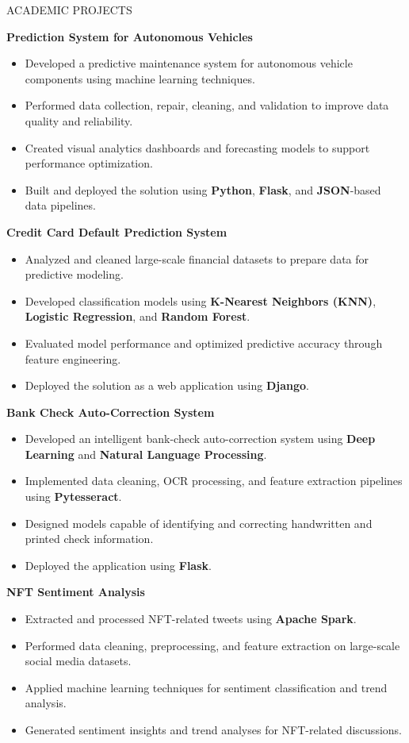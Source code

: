 \documentclass{resume} %
\begin{document}
\begin{rSection}{ACADEMIC PROJECTS}

\textbf{Prediction System for Autonomous Vehicles}
\begin{itemize}
  \itemsep -3pt
  \item Developed a predictive maintenance system for autonomous vehicle components using machine learning techniques.
  \item Performed data collection, repair, cleaning, and validation to improve data quality and reliability.
  \item Created visual analytics dashboards and forecasting models to support performance optimization.
  \item Built and deployed the solution using \textbf{Python}, \textbf{Flask}, and \textbf{JSON}-based data pipelines.
\end{itemize}

\textbf{Credit Card Default Prediction System}
\begin{itemize}
  \itemsep -3pt
  \item Analyzed and cleaned large-scale financial datasets to prepare data for predictive modeling.
  \item Developed classification models using \textbf{K-Nearest Neighbors (KNN)}, \textbf{Logistic Regression}, and \textbf{Random Forest}.
  \item Evaluated model performance and optimized predictive accuracy through feature engineering.
  \item Deployed the solution as a web application using \textbf{Django}.
\end{itemize}

\textbf{Bank Check Auto-Correction System}
\begin{itemize}
  \itemsep -3pt
  \item Developed an intelligent bank-check auto-correction system using \textbf{Deep Learning} and \textbf{Natural Language Processing}.
  \item Implemented data cleaning, OCR processing, and feature extraction pipelines using \textbf{Pytesseract}.
  \item Designed models capable of identifying and correcting handwritten and printed check information.
  \item Deployed the application using \textbf{Flask}.
\end{itemize}

\textbf{NFT Sentiment Analysis}
\begin{itemize}
  \itemsep -3pt
  \item Extracted and processed NFT-related tweets using \textbf{Apache Spark}.
  \item Performed data cleaning, preprocessing, and feature extraction on large-scale social media datasets.
  \item Applied machine learning techniques for sentiment classification and trend analysis.
  \item Generated sentiment insights and trend analyses for NFT-related discussions.
\end{itemize}

\end{rSection}
\end{document}
